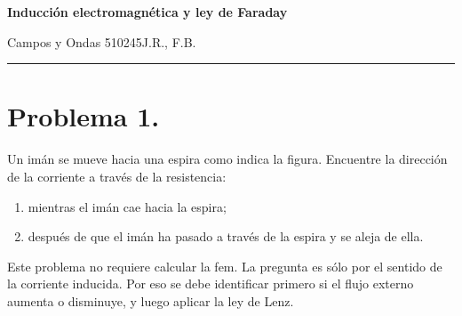 \documentclass[11pt]{article}
\newcommand{\encabezado}[3]{%
{\Large\bfseries #1\par}
\vspace{2pt}
{\normalsize #2\hfill #3\par}
\vspace{6pt}\hrule\vspace{8pt}}
\begin{document}
\encabezado{Inducción electromagnética y ley de Faraday}{Campos y Ondas 510245}{J.R., F.B.}
\shorthandoff{<>}

\section*{Problema 1.}
Un im\'an se mueve hacia una espira como indica la figura. Encuentre la direcci\'on de la corriente a trav\'es de la resistencia:
\begin{enumerate}[label=(\alph*)]
    \item mientras el im\'an cae hacia la espira;
    \item despu\'es de que el im\'an ha pasado a trav\'es de la espira y se aleja de ella.
\end{enumerate}


Este problema no requiere calcular la fem. La pregunta es s\'olo por el sentido de la corriente inducida. Por eso se debe identificar primero si el flujo externo aumenta o disminuye, y luego aplicar la ley de Lenz.
\end{document}
